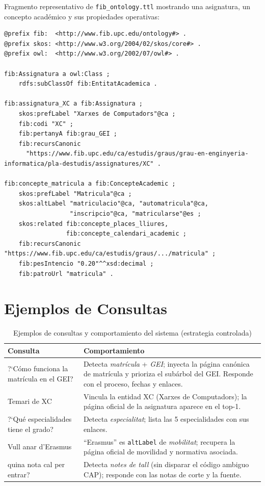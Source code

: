\documentclass[12pt, a4paper, twoside]{report}
\begin{document}
\begin{appendices}
Fragmento representativo de \texttt{fib\_ontology.ttl} mostrando una asignatura, un concepto acad\'emico y sus propiedades operativas:

\begin{lstlisting}[language={}, caption={Extracto de fib\_ontology.ttl}]
@prefix fib:  <http://www.fib.upc.edu/ontology#> .
@prefix skos: <http://www.w3.org/2004/02/skos/core#> .
@prefix owl:  <http://www.w3.org/2002/07/owl#> .

fib:Assignatura a owl:Class ;
    rdfs:subClassOf fib:EntitatAcademica .

fib:assignatura_XC a fib:Assignatura ;
    skos:prefLabel "Xarxes de Computadors"@ca ;
    fib:codi "XC" ;
    fib:pertanyA fib:grau_GEI ;
    fib:recursCanonic
      "https://www.fib.upc.edu/ca/estudis/graus/grau-en-enginyeria-informatica/pla-destudis/assignatures/XC" .

fib:concepte_matricula a fib:ConcepteAcademic ;
    skos:prefLabel "Matricula"@ca ;
    skos:altLabel "matriculacio"@ca, "automatricula"@ca,
                  "inscripcio"@ca, "matricularse"@es ;
    skos:related fib:concepte_places_lliures,
                 fib:concepte_calendari_academic ;
    fib:recursCanonic "https://www.fib.upc.edu/ca/estudis/graus/.../matricula" ;
    fib:pesIntencio "0.20"^^xsd:decimal ;
    fib:patroUrl "matricula" .
\end{lstlisting}

\chapter{Ejemplos de Consultas}
\label{app:ejemplos}

\begin{table}[H]
\centering
\caption{Ejemplos de consultas y comportamiento del sistema (estrategia controlada)}
\label{tab:ejemplos}
\begin{tabularx}{\textwidth}{XX}
\toprule
\textbf{Consulta} & \textbf{Comportamiento} \\
\midrule
?`C\'omo funciona la matr\'icula en el GEI? & Detecta \textit{matr\'icula} + \textit{GEI}; inyecta la p\'agina can\'onica de matr\'icula y prioriza el sub\'arbol del GEI. Responde con el proceso, fechas y enlaces. \\
Temari de XC & Vincula la entidad XC (Xarxes de Computadors); la p\'agina oficial de la asignatura aparece en el top-1. \\
?`Qu\'e especialidades tiene el grado? & Detecta \textit{especialitat}; lista las 5 especialidades con sus enlaces. \\
Vull anar d'Erasmus & ``Erasmus'' es \texttt{altLabel} de \textit{mobilitat}; recupera la p\'agina oficial de movilidad y normativa asociada. \\
quina nota cal per entrar? & Detecta \textit{notes de tall} (sin disparar el c\'odigo ambiguo CAP); responde con las notas de corte y la fuente. \\
\bottomrule
\end{tabularx}
\end{table}


\end{appendices}
\end{document}

